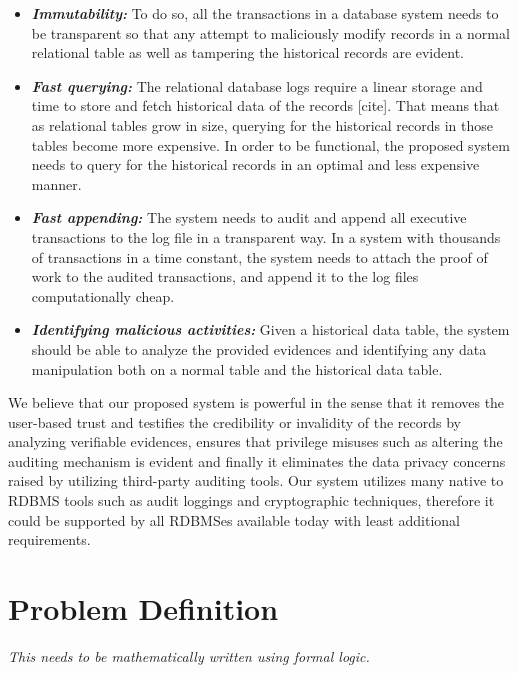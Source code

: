 \begin{itemize}
  \item \textbf{\textit{Immutability:}} To do so, all the transactions in a database system needs to be transparent so that any attempt to maliciously modify records in a normal relational table as well as tampering the historical records are evident.
  \item \textbf{\textit{Fast querying:}} The relational database logs require a linear storage and time to store and fetch historical data of the records [cite]. That means that as relational tables grow in size, querying for the historical records in those tables become more expensive. In order to be functional, the proposed system needs to query for the historical records in an optimal and less expensive manner.\
  \item \textbf{\textit{Fast appending:}} The system needs to audit and append all executive transactions to the log file in a transparent way. In a system with thousands of transactions in a time constant, the system needs to attach the proof of work to the audited transactions, and append it to the log files computationally cheap.
  \item \textbf{\textit{Identifying malicious activities:}} Given a historical data table, the system should be able to analyze the provided evidences and identifying any data manipulation both on a normal table and the historical data table.
\end{itemize} 
We believe that our proposed system is powerful in the sense that it removes the user-based trust and testifies the credibility or invalidity of the records by analyzing verifiable evidences, ensures that privilege misuses such as altering the auditing mechanism is evident and finally it eliminates the data privacy concerns raised by utilizing third-party auditing tools. Our system utilizes many native to RDBMS tools such as audit loggings and cryptographic techniques, therefore it could be supported by all RDBMSes available today with least additional requirements.

\section{Problem Definition}

{\it This needs to be mathematically written using formal logic.}
